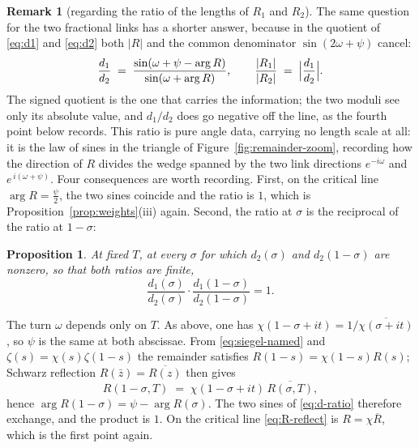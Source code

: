 \documentclass[11pt]{article}
\newtheorem{proposition}[theorem]{Proposition}
\theoremstyle{definition}
\newtheorem{remark}[theorem]{Remark}
\begin{document}
\begin{remark}[regarding the ratio of the lengths of $R_{1}$ and $R_{2}$]\label{rem:d-ratio}
The same question for the two fractional links has a shorter answer, because in
the quotient of \eqref{eq:d1} and \eqref{eq:d2} both $|R|$ and the common
denominator $\sin(2\omega+\psi)$ cancel:
\begin{equation}\label{eq:d-ratio}
\frac{d_1}{d_2}
\;=\;
\frac{\sin(\omega+\psi-\arg R)}{\sin(\omega+\arg R)},
\qquad
\frac{|R_{1}|}{|R_{2}|}
\;=\;
\Bigl|\frac{d_1}{d_2}\Bigr| .
\end{equation}
The signed quotient is the one that carries the information; the two moduli
see only its absolute value, and $d_1/d_2$ does go negative off the line, as
the fourth point below records.
This ratio is pure angle data, carrying no length scale at all: it is the law
of sines in the triangle of Figure~\ref{fig:remainder-zoom}, recording how the
direction of $R$ divides the wedge spanned by the two link directions
$e^{-i\omega}$ and $e^{\,i(\omega+\psi)}$. Four consequences are worth
recording. First, on the critical line $\arg R=\tfrac{\psi}{2}$, the two sines
coincide and the ratio is $1$, which is Proposition~\ref{prop:weights}(iii) again.
Second, the ratio at $\sigma$ is the reciprocal of the ratio at $1-\sigma$:

\begin{proposition}\label{prop:d-ratio-reflection}
At fixed $T$, at every $\sigma$ for which $d_2(\sigma)$ and $d_2(1-\sigma)$
are nonzero, so that both ratios are finite,
\begin{equation}\label{eq:d-ratio-symmetry}
\frac{d_1(\sigma)}{d_2(\sigma)}
\cdot
\frac{d_1(1-\sigma)}{d_2(1-\sigma)}
=
1.
\end{equation}
\end{proposition}

The turn $\omega$ depends only on $T$. As above, one has
$\chi(1-\sigma+it)=1/\overline{\chi(\sigma+it)}$, so $\psi$ is the same at
both abscissae. From \eqref{eq:siegel-named} and
$\zeta(s)=\chi(s)\zeta(1-s)$ the remainder satisfies
$R(1-s)=\chi(1-s)R(s)$; Schwarz reflection
$R(\bar z)=\overline{R(z)}$ then gives
\begin{equation}\label{eq:R-reflect}
R(1-\sigma,T)
\;=\;
\chi(1-\sigma+it)\,\overline{R(\sigma,T)},
\end{equation}
hence $\arg R(1-\sigma)=\psi-\arg R(\sigma)$.
The two sines of \eqref{eq:d-ratio} therefore exchange, and the product is $1$.
On the critical line \eqref{eq:R-reflect} is $R=\chi\overline{R}$, which is
the first point again.


\end{remark}
\end{document}
